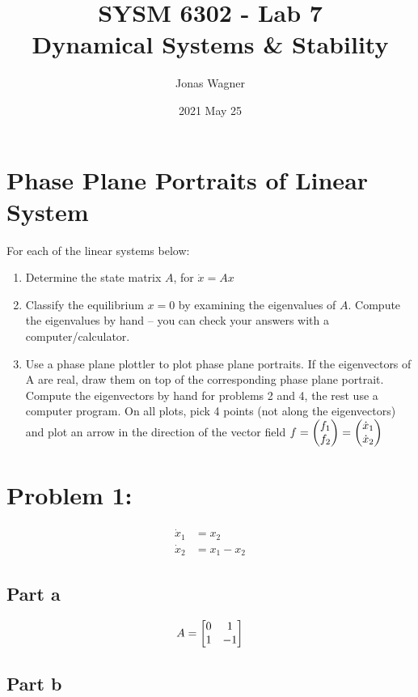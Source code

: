 \documentclass[]{article}
\title{SYSM 6302 - Lab 7\\
Dynamical Systems \& Stability}
\author{Jonas Wagner}
\date{2021 May 25}
\begin{document}
	

\maketitle

\newpage
\section*{Phase Plane Portraits of Linear System}

For each of the linear systems below:
\begin{enumerate}
	\item Determine the state matrix $A$, for $\dot{x} = A x$
	\item Classify the equilibrium $x = 0$ by examining the eigenvalues of $A$. Compute the eigenvalues by hand – you can check your answers with a computer/calculator.
	\item Use a phase plane plottler to plot phase plane portraits. If the eigenvectors of A are real, draw them on top of the corresponding phase plane portrait. Compute the eigenvectors by hand for problems 2 and 4, the rest use a computer program. On all plots, pick 4 points (not along the eigenvectors) and plot an arrow in the direction of the vector field $f = \mqty(f_1\\ f_2) = \mqty(\dot{x}_1\\ \dot{x}_2)$
\end{enumerate}



\section{Problem 1:}
\begin{align*}
	\dot{x}_1 &= x_2\\
	\dot{x}_2 &= x_1 - x_2
\end{align*}

\subsection{Part a}
\begin{displaymath}
	A = \mqty[0&1\\1&-1]
\end{displaymath}

\subsection{Part b}
\end{document}
